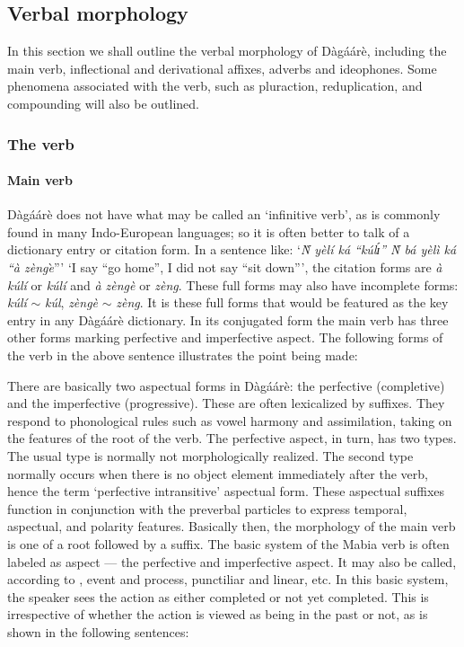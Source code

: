 \subsection{Verbal morphology}
In this section we shall outline the verbal morphology of Dàgáárè, including the main
verb, inflectional and derivational affixes, adverbs and ideophones. Some phenomena
associated with the verb, such as pluraction, reduplication, and compounding will also be
outlined.

\subsubsection{ The verb}
\paragraph{Main verb}
Dàgáárè does not have what may be called an ‘infinitive verb’, as is commonly found
in many Indo-European languages; so it is often better to talk of a dictionary entry or citation
form. In a sentence like: ‘\textit{Ǹ yèlí ká “kúlɪ́” Ǹ bá yèlì ká “à zènge}̀”’ ‘I say “go home”, I did
not say “sit down”’, the citation forms are \textit{à kúlí} or \textit{kúlí} and   \textit{à zèngè} or \textit{zèng}. These full forms may also have incomplete forms: \textit{kúlí}  $\sim$ \textit{kúl}, \textit{zèngè}  $\sim$ \textit{zèng}. It is these full forms
that would be featured as the key entry in any Dàgáárè dictionary.
In its conjugated form the main verb has three other forms marking perfective and
imperfective aspect. The following forms of the verb in the above sentence illustrates the
point being made:

\ea {}
\z\z


There are basically two aspectual forms in Dàgáárè: the perfective (completive) and the
imperfective (progressive). These are often lexicalized by suffixes. They respond to
phonological rules such as vowel harmony and assimilation, taking on the features of the root
of the verb. The perfective aspect, in turn, has two types. The usual type is normally not
morphologically realized. The second type normally occurs when there is no object element
immediately after the verb, hence the term ‘perfective intransitive’ aspectual form. These
aspectual suffixes function in conjunction with the preverbal particles to express temporal,
aspectual, and polarity features. Basically then, the morphology of the main verb is one of a
root followed by a suffix.
The basic system of the Mabia verb is often labeled as aspect — the perfective and
imperfective aspect. It may also be called, according to \citep{Bendor-Samuel1971}, event and
process, punctiliar and linear, etc. In this basic system, the speaker sees the action as either
completed or not yet completed. This is irrespective of whether the action is viewed as being
in the past or not, as is shown in the following sentences:

